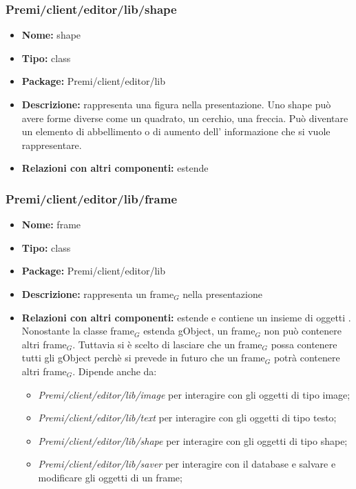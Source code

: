 \subsubsection{Premi/client/editor/lib/shape}
\begin{itemize}
  \item[] \textbf{Nome:} shape
  \item[] \textbf{Tipo:} class
  \item[] \textbf{Package:} Premi/client/editor/lib
  \item[] \textbf{Descrizione:} rappresenta una figura nella presentazione. Uno shape può avere forme diverse come un quadrato, un cerchio, una freccia. Può diventare un elemento di abbellimento o di aumento dell' informazione che si vuole rappresentare. 
  \item[] \textbf{Relazioni con altri componenti:} estende 
\end{itemize}
\subsubsection{Premi/client/editor/lib/frame}
\begin{itemize}
  \item[] \textbf{Nome:} frame
  \item[] \textbf{Tipo:} class
  \item[] \textbf{Package:} Premi/client/editor/lib
  \item[] \textbf{Descrizione:} rappresenta un frame$_G$ nella presentazione
  \item[] \textbf{Relazioni con altri componenti:} estende  e contiene un insieme di oggetti . Nonostante la classe frame$_G$ estenda gObject, un frame$_G$ non può contenere altri frame$_G$. Tuttavia si è scelto di lasciare che un frame$_G$ possa contenere tutti gli gObject perchè si prevede in futuro che un frame$_G$ potrà contenere altri frame$_G$. Dipende anche da: 
\begin{itemize} 
	\item \textit{Premi/client/editor/lib/image} per interagire con gli oggetti di tipo image;
	\item \textit{Premi/client/editor/lib/text} per interagire con gli oggetti di tipo testo;
	\item \textit{Premi/client/editor/lib/shape} per interagire con gli oggetti di tipo shape;
	\item \textit{Premi/client/editor/lib/saver} per interagire con il database e salvare e modificare gli oggetti di un frame;
\end{itemize}  
\end{itemize}
